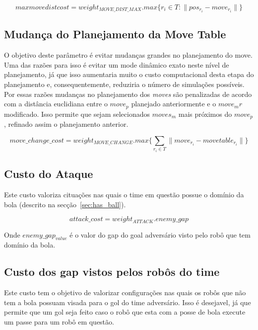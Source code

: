\begin{dmath} 
 max move dist cost = weight_{MOVE{\_}DIST{\_}MAX} . 
 max \lbrace r_i \in T : \lVert pos_{r_i} - move_{r_i}\rVert \rbrace
\end{dmath} 

\subsection{Mudança do Planejamento da Move Table}
O objetivo deste parâmetro é evitar mudanças grandes no
planejamento do move. Uma das razões para isso é evitar um mode dinâmico
exato neste nível de planejamento, já que isso aumentaria muito o custo
computacional desta etapa do planejamento e, consequentemente, reduziria
o número de simulações possíveis. Por essas razões mudanças no planejamento
dos \textit{moves} são penalizadas de acordo com a distância euclidiana
entre o $move_p$ planejado anteriormente e o $move_mr$ modificado.
Isso permite que sejam selecionados $moves_m$ mais próximos do
$move_p$, refinado assim o planejamento anterior.

\begin{dmath} 
 move{\_}change{\_}cost = weight_{MOVE{\_}CHANGE} . 
 max \lbrace \sum_{r_i \in T} \lVert move_{r_i} - move table_{r_i}\rVert \rbrace
\end{dmath} 

\subsection{Custo do Ataque}
Este custo valoriza cituações nas quais o time em questão
possue o domínio da bola (descrito na secção~\ref{sec:has_ball}).

\begin{dmath} 
 attack{\_}cost = weight_{ATTACK} . enemy{\_}gap
\end{dmath} 

Onde $enemy{\_}gap_{value}$ é o valor do gap do goal adversário visto
pelo robô que tem domínio da bola.

\subsection{Custo dos gap vistos pelos robôs do time}

Este custo tem o objetivo de valorizar configurações nas quais
os robôs que não tem a bola possuam visada para o gol do time
adversário. Isso
é desejavel, já que permite que um gol seja feito caso o robô
que esta com a posse de bola execute um passe para um robô
em questão.


